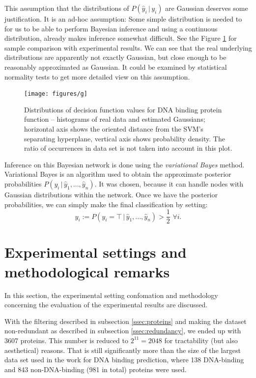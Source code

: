 \documentclass[11pt,twoside,a4paper]{book}
\begin{document}
This assumption that the distributions of $P(\hat{y}_i\,|\,y_i)$ are Gaussian  
deserves some justification.
It is an ad-hoc assumption:
Some simple distribution is needed to for us
to be able to perform Bayesian inference
and using a continuous distribution,
already makes inference somewhat difficult.
See the Figure \ref{fig:gaussians}
for sample comparison with experimental results.
We can see that the real underlying distributions are apparently not exactly Gaussian,
but close enough to be reasonably approximated as Gaussian.
It could be examined by statistical normality tests to get more detailed view on this assumption.

\begin{figure}[h]
\begin{center}
\texttt{[image: figures/g]}
\caption[Probability distributions of decision function values for DNA binding]{Distributions of decision function values for DNA binding protein function -- histograms of real data and estimated Gaussians;
horizontal axis shows the oriented distance from the SVM's separating hyperplane, vertical axis shows probability density.
The ratio of occurrences in data set is not taken into account in this plot.}
\label{fig:gaussians}
\end{center}
\end{figure}

Inference on this Bayesian network is done using the \emph{variational Bayes} \cite{varb} method.
Variational Bayes is an algorithm used to
obtain the approximate posterior probabilities $P(y_i \, | \, \hat{y}_1, ..., \hat{y}_n).$
It was chosen, because it can handle nodes with Gaussian distributions within the network.
Once we have the posterior probabilities, 
we can simply make the final classification by setting:
\[ y_i := P(y_i = \top \, | \, \hat{y}_1, ..., \hat{y}_n) > \frac{1}{2} \, \, \forall i. \]

\section{Experimental settings and methodological remarks}
\label{sec:method}
In this section, the experimental setting confomation and
methodology concerning the evaluation
of the experimental results are discussed.

With the filtering described in subsection \ref{ssec:proteins}
and making the dataset non-redundant as described in subsection \ref{ssec:redundancy},
we ended up with 3607 proteins.
This number is reduced to $2^{11} = 2048$ for tractability (but also aesthetical) reasons. 
That is still significantly more than the size of the largest data set used in the work
\cite{szabova} for DNA binding prediction,
where 138 DNA-binding and 843 non-DNA-binding (981 in total) proteins were used.
\end{document}

